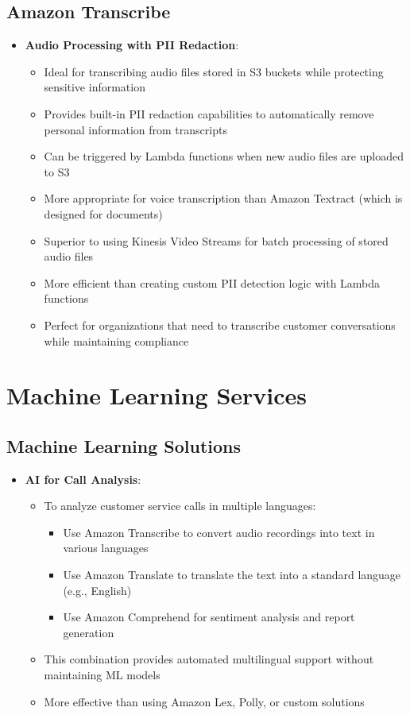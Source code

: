 \documentclass[11pt,a4paper]{report}
\begin{document}
\section{Amazon Transcribe}

\begin{itemize}
  \item \textbf{Audio Processing with PII Redaction}:
\begin{itemize}
  \item Ideal for transcribing audio files stored in S3 buckets while protecting sensitive information
  \item Provides built-in PII redaction capabilities to automatically remove personal information from transcripts
  \item Can be triggered by Lambda functions when new audio files are uploaded to S3
  \item More appropriate for voice transcription than Amazon Textract (which is designed for documents)
  \item Superior to using Kinesis Video Streams for batch processing of stored audio files
  \item More efficient than creating custom PII detection logic with Lambda functions
  \item Perfect for organizations that need to transcribe customer conversations while maintaining compliance
\end{itemize}
\end{itemize}


\chapter{Machine Learning Services}



\section{Machine Learning Solutions}

\begin{itemize}
  \item \textbf{AI for Call Analysis}:
\begin{itemize}
  \item To analyze customer service calls in multiple languages:
\begin{itemize}
  \item Use Amazon Transcribe to convert audio recordings into text in various languages
  \item Use Amazon Translate to translate the text into a standard language (e.g., English)
  \item Use Amazon Comprehend for sentiment analysis and report generation
\end{itemize}
  \item This combination provides automated multilingual support without maintaining ML models
  \item More effective than using Amazon Lex, Polly, or custom solutions
\end{itemize}
\end{itemize}
\end{document}
